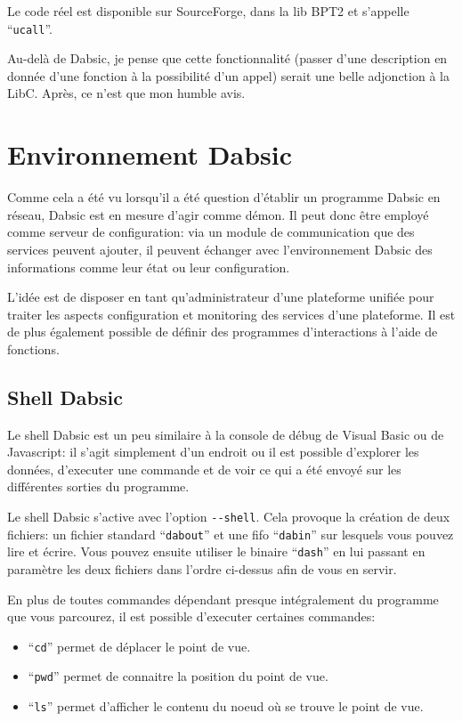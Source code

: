 \documentclass[a5paper, 12pt]{book}
\begin{document}
Le code réel est disponible sur SourceForge, dans la lib BPT2 et
s'appelle ``\verb!ucall!''.

Au-delà de Dabsic, je pense que cette fonctionnalité (passer
d'une description en donnée d'une fonction à la possibilité
d'un appel) serait une belle adjonction à la LibC. Après, ce
n'est que mon humble avis.

\chapter{Environnement Dabsic}

Comme cela a été vu lorsqu'il a été question d'établir
un programme Dabsic en réseau, Dabsic est en mesure
d'agir comme démon. Il peut donc être employé comme
serveur de configuration: via un module de communication
que des services peuvent ajouter, il peuvent échanger
avec l'environnement Dabsic des informations comme
leur état ou leur configuration.

L'idée est de disposer en tant qu'administrateur d'une
plateforme unifiée pour traiter les aspects configuration
et monitoring des services d'une plateforme. Il est
de plus également possible de définir des programmes
d'interactions à l'aide de fonctions.

\section{Shell Dabsic}

Le shell Dabsic est un peu similaire à la console de débug
de Visual Basic ou de Javascript: il s'agit simplement
d'un endroit ou il est possible d'explorer les données,
d'executer une commande et de voir ce qui a été envoyé
sur les différentes sorties du programme.

Le shell Dabsic s'active avec l'option \verb!--shell!. Cela
provoque la création de deux fichiers: un fichier
standard ``\verb!dabout!'' et une fifo ``\verb!dabin!'' sur lesquels
vous pouvez lire et écrire. Vous pouvez ensuite utiliser
le binaire ``\verb!dash!'' en lui passant en paramètre les
deux fichiers dans l'ordre ci-dessus afin de vous
en servir.

En plus de toutes commandes dépendant presque intégralement
du programme que vous parcourez, il est possible
d'executer certaines commandes:

\begin{itemize}
  \item ``\verb!cd!'' permet de déplacer le point de vue.
  \item ``\verb!pwd!'' permet de connaitre la position du point de vue.
  \item ``\verb!ls!'' permet d'afficher le contenu du noeud où se
    trouve le point de vue.
\end{itemize}
\end{document}
